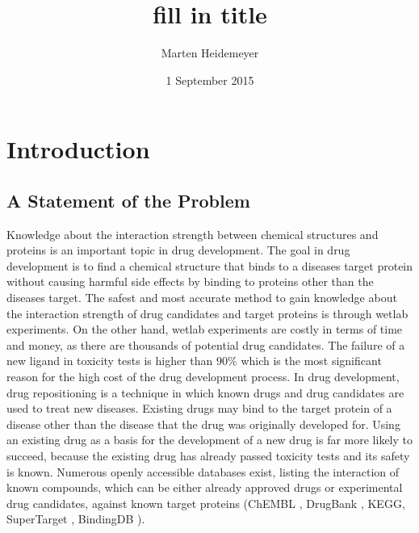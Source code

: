 \documentclass{sfuthesis}
\title{fill in title}
\author{Marten Heidemeyer}
\date{1 September 2015}
\begin{document}
\frontmatter
\maketitle{}

\begin{abstract}
	
\end{abstract}


\begin{dedication} %
\end{dedication}


\begin{acknowledgements} %
\end{acknowledgements}

\tableofcontents\clearpage
{}\listoftables\clearpage
{}\listoffigures





%
%

\mainmatter%

\chapter{Introduction}

\section{A Statement of the Problem}

Knowledge about the interaction strength between chemical structures and proteins is an important topic in drug development.
The goal in drug development is to find a chemical structure that binds to a diseases target protein without causing harmful side effects by binding to proteins other than the diseases target.
The safest and most accurate method to gain knowledge about the interaction strength of drug candidates and target proteins is through wetlab experiments. On the other hand, wetlab experiments are costly in terms of time and money, as there are thousands of potential drug candidates. The failure of a new ligand in toxicity tests is higher than $90\%$ which is the most significant reason for the high cost of the drug development process. In drug development, drug repositioning is a technique in which known drugs and drug candidates are used to treat new diseases. Existing drugs may bind to the target protein of a disease other than the disease that the drug was originally developed for. Using an existing drug as a basis for the development of a new drug is far more likely to succeed, because the existing drug has already passed toxicity tests and its safety is known. Numerous openly accessible databases exist, listing the interaction of known compounds, which can be either already approved drugs or experimental drug candidates, against known target proteins (ChEMBL \cite{gaulton2012chembl}, DrugBank \cite{wishart2008drugbank}, KEGG\cite{kanehisa2011kegg}, SuperTarget \cite{gunther2008supertarget}, BindingDB \cite{liu2007bindingdb}). 
\end{document}
